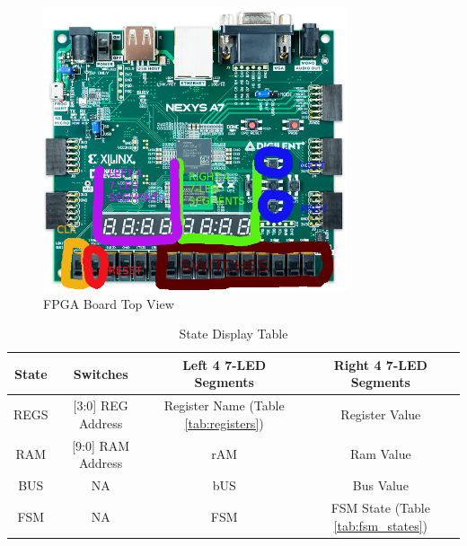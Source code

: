 \documentclass{article}
\begin{document}
\begin{figure}
    \centering
    \includegraphics[width=0.8\textwidth]{nexys-a7-top_mod.png}
    \caption{FPGA Board Top View}
    \label{fig:fpga}
\end{figure}

\begin{table}[h!]
    \centering
    \begin{tabular}{|c|c|c|c|}
        \hline
        \textbf{State} & \textbf{Switches} & \textbf{Left 4 7-LED Segments} & \textbf{Right 4 7-LED Segments} \\
        \hline
        REGS & [3:0] REG Address& Register Name (Table \ref{tab:registers}) & Register Value\\
        \hline
        RAM & [9:0] RAM Address& rAM & Ram Value\\
        \hline
        BUS & NA & bUS & Bus Value\\
        \hline
        FSM & NA & FSM & FSM State (Table \ref{tab:fsm_states})\\
        \hline
    \end{tabular}
    \caption{State Display Table}
    \label{tab:state_display}
\end{table}
\end{document}
